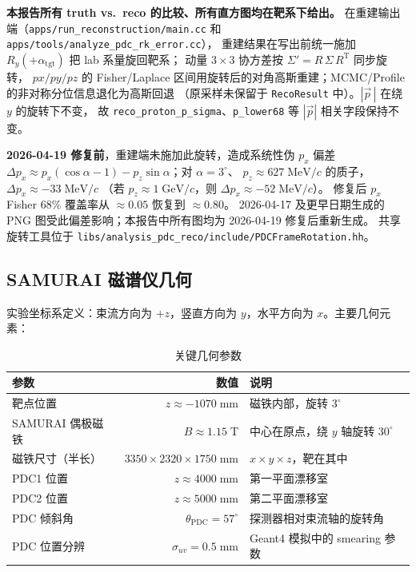 \documentclass[a4paper, 11pt]{article}
\begin{document}
\textbf{本报告所有 truth vs.\ reco 的比较、所有直方图均在靶系下给出。}
在重建输出端（\texttt{apps/run\_reconstruction/main.cc} 和 \texttt{apps/tools/analyze\_pdc\_rk\_error.cc}），
重建结果在写出前统一施加 $R_y(+\alpha_\mathrm{tgt})$ 把 lab 系量旋回靶系；
动量 $3\times 3$ 协方差按 $\Sigma' = R\,\Sigma\,R^\mathrm{T}$ 同步旋转，
$px/py/pz$ 的 Fisher/Laplace 区间用旋转后的对角高斯重建；MCMC/Profile 的非对称分位信息退化为高斯回退
（原采样未保留于 \texttt{RecoResult} 中）。$|\vec p\,|$ 在绕 $y$ 的旋转下不变，
故 \texttt{reco\_proton\_p\_sigma}、\texttt{p\_lower68} 等 $|\vec p|$ 相关字段保持不变。

\textbf{2026-04-19 修复前}，重建端未施加此旋转，造成系统性伪 $p_x$ 偏差
$\Delta p_x \approx p_x(\cos\alpha - 1) - p_z\sin\alpha$；对 $\alpha = 3^\circ$、
$p_z \approx 627\;\mathrm{MeV}/c$ 的质子，$\Delta p_x \approx -33\;\mathrm{MeV}/c$
（若 $p_z \approx 1\;\mathrm{GeV}/c$，则 $\Delta p_x \approx -52\;\mathrm{MeV}/c$）。
修复后 $p_x$ Fisher 68\% 覆盖率从 $\approx 0.05$ 恢复到 $\approx 0.80$。
2026-04-17 及更早日期生成的 PNG 图受此偏差影响；本报告中所有图均为 2026-04-19 修复后重新生成。
共享旋转工具位于 \texttt{libs/analysis\_pdc\_reco/include/PDCFrameRotation.hh}。

\subsection{SAMURAI 磁谱仪几何}

实验坐标系定义：束流方向为 $+z$，竖直方向为 $y$，水平方向为 $x$。主要几何元素：

\begin{table}[H]
\centering
\caption{关键几何参数}
\begin{tabular}{lrl}
\toprule
参数 & 数值 & 说明 \\
\midrule
靶点位置 & $z \approx -1070\;\mathrm{mm}$ & 磁铁内部，旋转 $3^\circ$ \\
SAMURAI 偶极磁铁 & $B \approx 1.15\;\mathrm{T}$ & 中心在原点，绕 $y$ 轴旋转 $30^\circ$ \\
磁铁尺寸（半长） & $3350 \times 2320 \times 1750\;\mathrm{mm}$ & $x \times y \times z$，靶在其中 \\
PDC1 位置 & $z \approx 4000\;\mathrm{mm}$ & 第一平面漂移室 \\
PDC2 位置 & $z \approx 5000\;\mathrm{mm}$ & 第二平面漂移室 \\
PDC 倾斜角 & $\theta_\mathrm{PDC} = 57^\circ$ & 探测器相对束流轴的旋转角 \\
PDC 位置分辨 & $\sigma_{uv} = 0.5\;\mathrm{mm}$ & Geant4 模拟中的 smearing 参数 \\
\bottomrule
\end{tabular}
\end{table}
\end{document}
